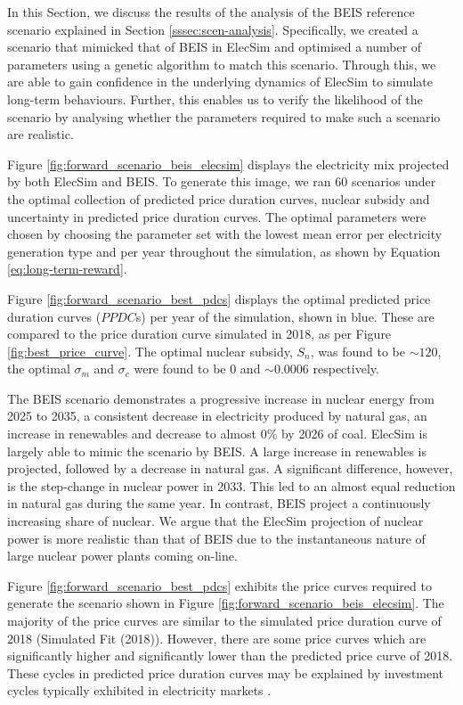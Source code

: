 In this Section, we discuss the results of the analysis of the BEIS reference scenario explained in Section \ref{sssec:scen-analysis}. Specifically, we created a scenario that mimicked that of BEIS in ElecSim and optimised a number of parameters using a genetic algorithm to match this scenario. Through this, we are able to gain confidence in the underlying dynamics of ElecSim to simulate long-term behaviours. Further, this enables us to verify the likelihood of the scenario by analysing whether the parameters required to make such a scenario are realistic.

Figure \ref{fig:forward_scenario_beis_elecsim} displays the electricity mix projected by both ElecSim and BEIS. To generate this image, we ran 60 scenarios under the optimal collection of predicted price duration curves, nuclear subsidy and uncertainty in predicted price duration curves. The optimal parameters were chosen by choosing the parameter set with the lowest mean error per electricity generation type and per year throughout the simulation, as shown by Equation \ref{eq:long-term-reward}.


Figure \ref{fig:forward_scenario_best_pdcs} displays the optimal predicted price duration curves ($PPDC$s) per year of the simulation, shown in blue. These are compared to the price duration curve simulated in 2018, as per Figure \ref{fig:best_price_curve}. The optimal nuclear subsidy, $S_n$, was found to be ${\sim}$\textsterling $120$, the optimal $\sigma_m$ and $\sigma_c$ were found to be $0$ and ${\sim}0.0006$ respectively.

The BEIS scenario demonstrates a progressive increase in nuclear energy from 2025 to 2035, a consistent decrease in electricity produced by natural gas, an increase in renewables and decrease to almost 0\% by 2026 of coal. ElecSim is largely able to mimic the scenario by BEIS. A large increase in renewables is projected, followed by a decrease in natural gas. A significant difference, however, is the step-change in nuclear power in 2033. This led to an almost equal reduction in natural gas during the same year. In contrast, BEIS project a continuously increasing share of nuclear. We argue that the ElecSim projection of nuclear power is more realistic than that of BEIS due to the instantaneous nature of large nuclear power plants coming on-line.

Figure \ref{fig:forward_scenario_best_pdcs} exhibits the price curves required to generate the scenario shown in Figure \ref{fig:forward_scenario_beis_elecsim}. The majority of the price curves are similar to the simulated price duration curve of 2018 (Simulated Fit (2018)). However, there are some price curves which are significantly higher and significantly lower than the predicted price curve of 2018. These cycles in predicted price duration curves may be explained by investment cycles typically exhibited in electricity markets \cite{Gross2007}. 

